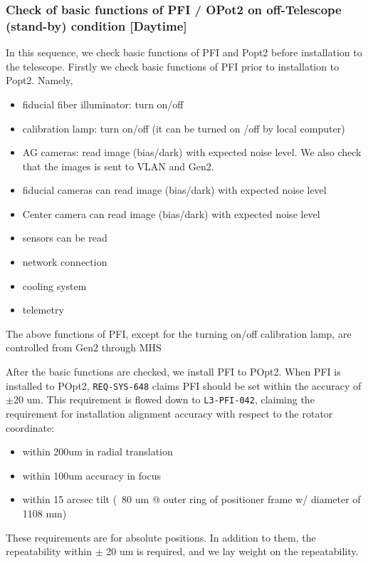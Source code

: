 \subsubsection{Check of basic functions of PFI / OPot2 on off-Telescope (stand-by) condition [Daytime]}\label{secflow:PFIoff}
In this sequence, we check basic functions of PFI and Popt2 before installation to the telescope.
Firstly we check basic functions of PFI prior to installation to Popt2.
Namely,
\begin{itemize}
\item fiducial fiber illuminator: turn on/off
\item calibration lamp: turn on/off (it can be turned on /off by local computer)
\item AG cameras: read image (bias/dark) with expected noise level.
We also check that the images is sent to VLAN and Gen2.
\item fiducial cameras can read image (bias/dark) with expected noise level
\item Center camera can read image (bias/dark) with expected noise level
\item sensors can be read
\item network connection
\item cooling system
\item telemetry
\end{itemize}
The above functions of PFI, except for the turning on/off calibration lamp, are controlled from Gen2 through MHS

After the basic functions are checked, we install PFI to POpt2.
When PFI is installed to POpt2, {\tt REQ-SYS-648} claims PFI should be set within the accuracy of $\pm$20 um.
This requirement is flowed down to {\tt L3-PFI-042}, claiming the requirement for installation alignment accuracy with respect to the rotator coordinate:
\begin{itemize}
\item within 200um in radial translation
\item  within 100um accuracy in focus
\item  within 15 arcsec tilt (~80 um @ outer ring of positioner frame w/ diameter of 1108 mm)
\end{itemize}
These requirements are for absolute positions.
In addition to them, the repeatability within $\pm$ 20 um is required, and we lay weight on the repeatability.

